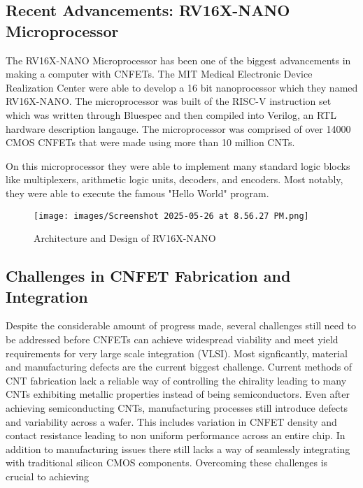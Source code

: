 \documentclass[sigconf,authordraft]{acmart}
\begin{document}
\subsection{Recent Advancements: RV16X-NANO Microprocessor}
The RV16X-NANO Microprocessor has been one of the biggest advancements 
in making a computer with CNFETs. The MIT Medical Electronic Device 
Realization Center were able to develop a 16 bit nanoprocessor which
they named RV16X-NANO. The microprocessor was built of the RISC-V
instruction set which was written through Bluespec and then compiled 
into Verilog, an RTL hardware description langauge. The microprocessor 
was comprised of over 14000 CMOS CNFETs that were made using more than 
10 million CNTs. 

On this microprocessor they were able to implement many standard logic 
blocks like multiplexers, arithmetic logic units, decoders, and encoders. 
Most notably, they were able to execute the famous "Hello World"
program.

\begin{figure}
  \centering
  \texttt{[image: images/Screenshot 2025-05-26 at 8.56.27 PM.png]}
  \caption{Architecture and Design of RV16X-NANO}
\end{figure}

\subsection{Challenges in CNFET Fabrication and Integration}
Despite the considerable amount of progress made, several challenges 
still need to be addressed before CNFETs can achieve widespread 
viability and meet yield requirements for very large scale integration
(VLSI). Most signficantly, material and manufacturing defects are 
the current biggest challenge. Current methods of CNT fabrication 
lack a reliable way of controlling the chirality leading to many
CNTs exhibiting metallic properties instead of being semiconductors. 
Even after achieving semiconducting CNTs, manufacturing processes still
introduce defects and variability across a wafer. This includes variation
in CNFET density and contact resistance leading to non uniform performance
across an entire chip. In addition to manufacturing issues there 
still lacks a way of seamlessly integrating with traditional silicon
CMOS components. Overcoming these challenges is crucial to achieving 
\end{document}
